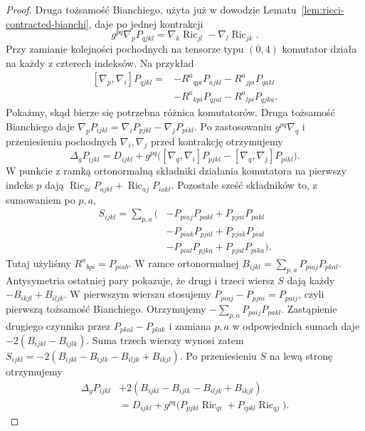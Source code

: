 \begin{proof}
Druga tożsamość Bianchiego, użyta już w dowodzie
Lematu~\ref{lem:ricci-contracted-bianchi}, daje po
jednej kontrakcji
\[
 g^{pq}\nabla_pP_{qjkl}
  =\nabla_k\operatorname{Ric}_{jl}
   -\nabla_l\operatorname{Ric}_{jk}.
\]
Przy zamianie kolejności pochodnych na tensorze
typu $(0,4)$ komutator działa na każdy z czterech
indeksów. Na przykład
\[
 \begin{split}
 [\nabla_p,\nabla_i]P_{qjkl}
 ={}&-R^a{}_{qpi}P_{ajkl}
     -R^a{}_{jpi}P_{qakl}\\
    &-R^a{}_{kpi}P_{qjal}
     -R^a{}_{lpi}P_{qjka}.
 \end{split}
\]
Pokażmy, skąd bierze się potrzebna różnica komutatorów.
Druga tożsamość Bianchiego daje
$\nabla_pP_{ijkl}=\nabla_iP_{pjkl}-\nabla_jP_{pikl}$.
Po zastosowaniu $g^{pq}\nabla_q$ i przeniesieniu
pochodnych $\nabla_i,\nabla_j$ przed kontrakcję otrzymujemy
\[
 \Delta_gP_{ijkl}=D_{ijkl}
 +g^{pq}\bigl([\nabla_q,\nabla_i]P_{pjkl}
             -[\nabla_q,\nabla_j]P_{pikl}\bigr).
\]
W punkcie z ramką ortonormalną składniki działania
komutatora na pierwszy indeks $p$ dają
$\operatorname{Ric}_{ai}P_{ajkl}
+\operatorname{Ric}_{aj}P_{iakl}$.
Pozostałe sześć składników to, z sumowaniem po $p,a$,
\[
 \begin{aligned}
 S_{ijkl}=\sum_{p,a}\bigl(&-P_{piaj}P_{pakl}
                         +P_{pjai}P_{pakl}\\
                       &-P_{piak}P_{pjal}
                         +P_{pjak}P_{pial}\\
                       &-P_{pial}P_{pjka}
                         +P_{pjal}P_{pika}\bigr).
 \end{aligned}
\]
Tutaj użyliśmy $R^a{}_{bpi}=P_{piab}$. W ramce ortonormalnej
$B_{ijkl}=\sum_{p,a}P_{piaj}P_{pkal}$.
Antysymetria ostatniej pary pokazuje, że drugi i trzeci
wiersz $S$ dają każdy $-B_{ikjl}+B_{iljk}$.
W pierwszym wierszu stosujemy
$P_{piaj}-P_{pjai}=P_{paij}$, czyli pierwszą tożsamość
Bianchiego. Otrzymujemy $-\sum_{p,a}P_{paij}P_{pakl}$.
Zastąpienie drugiego czynnika przez
$P_{pkal}-P_{plak}$ i zamiana $p,a$ w odpowiednich
sumach daje $-2(B_{ijkl}-B_{ijlk})$.
Suma trzech wierszy wynosi zatem
$S_{ijkl}=-2(B_{ijkl}-B_{ijlk}-B_{iljk}+B_{ikjl})$.
Po przeniesieniu $S$ na lewą stronę otrzymujemy
\begin{equation}\label{eq:ricci-P-laplacian-intermediate}
 \begin{aligned}
 \Delta_gP_{ijkl}
 &+2(B_{ijkl}-B_{ijlk}-B_{iljk}+B_{ikjl})\\
 &=D_{ijkl}
   +g^{pq}\bigl(P_{pjkl}\operatorname{Ric}_{qi}
              +P_{ipkl}\operatorname{Ric}_{qj}\bigr).

\end{aligned}
\end{equation}
\end{proof}
